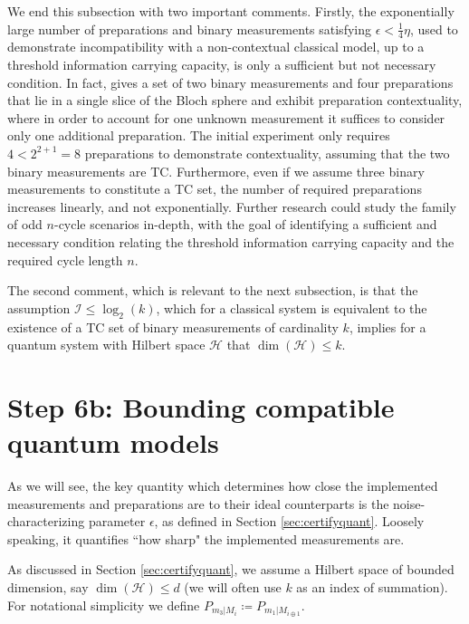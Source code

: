 We end this subsection with two important comments. Firstly, the exponentially large number of preparations and binary measurements satisfying $\epsilon<\frac{1}{4}\eta$, used to demonstrate incompatibility with a non-contextual classical model, up to a threshold information carrying capacity, is only a sufficient but not necessary condition. In fact, \cite{Pusey2019a} gives a set of two binary measurements and four preparations that lie in a single slice of the Bloch sphere and exhibit preparation contextuality, where in order to account for one unknown measurement it suffices to consider only one additional preparation. The initial experiment only requires $4<2^{2+1}=8$ preparations to demonstrate contextuality, assuming that the two binary measurements are TC. Furthermore, even if we assume three binary measurements to constitute a TC set, the number of required preparations increases linearly, and not exponentially. Further research could study the family of odd $n$-cycle scenarios in-depth, with the goal of identifying a sufficient and necessary condition relating the threshold information carrying capacity and the required cycle length $n$.

The second comment, which is relevant to the next subsection, is that the assumption $\mathcal{I}\leq\log_2(k)$, which for a classical system is equivalent to the existence of a TC set of binary measurements of cardinality $k$, implies for a quantum system with Hilbert space $\mathcal{H}$ that $\operatorname{dim}(\mathcal{H})\leq k$.

\section{Step 6b: Bounding compatible quantum models}
\label{sec:boundingmodels}

As we will see, the key quantity which determines how close the implemented measurements and preparations are to their ideal counterparts is the noise-characterizing parameter $\epsilon$, as defined in Section \ref{sec:certifyquant}. Loosely speaking, it quantifies ``how sharp" the implemented measurements are.
  
As discussed in Section \ref{sec:certifyquant}, we assume a Hilbert space of bounded dimension, say $\operatorname{dim}(\mathcal{H})\leq d$ (we will often use $k$ as an index of summation). For notational simplicity we define $P_{m_3\vert M_i}\coloneqq P_{m_1\vert M_{i\oplus 1}}$.

